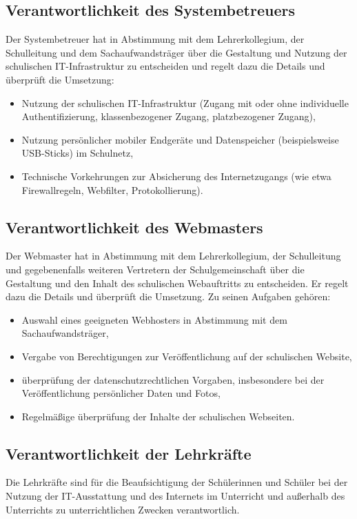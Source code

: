 \documentclass[a4paper, parskip]{scrartcl}
\begin{document}
\subsection{Verantwortlichkeit des Systembetreuers}
Der Systembetreuer hat in Abstimmung mit dem Lehrerkollegium, der Schulleitung
und dem Sachaufwandsträger über die Gestaltung und Nutzung der schulischen
IT-Infrastruktur zu entscheiden und regelt dazu die Details und überprüft die
Umsetzung:

\begin{itemize}
	\item{Nutzung der schulischen IT-Infrastruktur (Zugang mit oder ohne
		individuelle Authentifizierung, klassenbezogener Zugang,
	platzbezogener Zugang),}
	\item{Nutzung persönlicher mobiler Endgeräte und Datenspeicher
		(beispielsweise USB-Sticks) im Schulnetz,}
	\item{Technische Vorkehrungen zur Absicherung des Internetzugangs (wie
		etwa Firewallregeln, Webfilter, Protokollierung).}
\end{itemize}

\subsection{Verantwortlichkeit des Webmasters}
Der Webmaster hat in Abstimmung mit dem Lehrerkollegium, der Schulleitung und
gegebenenfalls weiteren Vertretern der Schulgemeinschaft über die Gestaltung
und den Inhalt des schulischen Webauftritts zu entscheiden. Er regelt dazu die
Details und überprüft die Umsetzung. Zu seinen Aufgaben gehören:

\begin{itemize}
	\item{Auswahl eines geeigneten Webhosters in Abstimmung mit dem
		Sachaufwandsträger,}
	\item{Vergabe von Berechtigungen zur Veröffentlichung auf der
		schulischen Website,}
	\item{überprüfung der datenschutzrechtlichen Vorgaben, insbesondere bei
		der Veröffentlichung persönlicher Daten und Fotos,}
	\item{Regelmäßige überprüfung der Inhalte der schulischen Webseiten.}
\end{itemize}

\subsection{Verantwortlichkeit der Lehrkräfte}
Die Lehrkräfte sind für die Beaufsichtigung der Schülerinnen und Schüler bei
der Nutzung der IT-Ausstattung und des Internets im Unterricht und außerhalb
des Unterrichts zu unterrichtlichen Zwecken verantwortlich.
\end{document}
